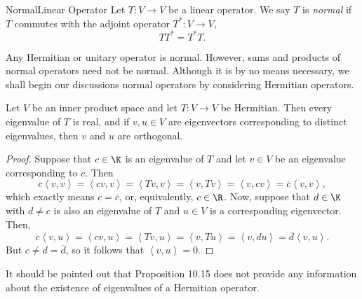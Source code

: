 \documentclass[linearalgebra]{subfiles}
\begin{document}
    \begin{definition}{Normal}{Linear Operator}
        Let $T:V\to V$ be a linear operator. We say $T$ is \emph{normal} if $T$ commutes with the adjoint operator $T^*:V\to V$,
        \begin{equation*}
            TT^* = T^*T.
        \end{equation*}
    \end{definition}

    \noindent Any Hermitian or unitary operator is normal. However, sums and products of normal operators need not be normal. Although it is by no means necessary, we shall begin our discussions normal operators by considering Hermitian operators.

    \begin{prop}{}
        Let $V$ be an inner product space and let $T:V\to V$ be Hermitian. Then every eigenvalue of $T$ is real, and if $v,u\in V$ are eigenvectors corresponding to distinct eigenvalues, then $v$ and $u$ are orthogonal.
    \end{prop}

    \begin{proof}
        Suppose that $c\in\K$ is an eigenvalue of $T$ and let $v\in V$ be an eigenvalue corresponding to $c$. Then
        \begin{equation*}
            c\left\langle v, v\right\rangle = \left\langle cv, v\right\rangle = \left\langle Tv, v\right\rangle = \left\langle v, Tv\right\rangle = \left\langle v, cv\right\rangle = \overline{c} \left\langle v, v\right\rangle ,
        \end{equation*}
        which exactly means $c=\overline{c}$, or, equivalently, $c\in\R$. Now, suppose that $d\in\K$ with $d\neq c$ is also an eigenvalue of $T$ and $u\in V$ is a corresponding eigenvector. Then,
        \begin{equation*}
            c\left\langle v, u\right\rangle = \left\langle cv, u\right\rangle = \left\langle Tv, u\right\rangle = \left\langle v, Tu\right\rangle = \left\langle v, du\right\rangle = \overline{d} \left\langle v, u\right\rangle .
        \end{equation*}
        But $c\neq d=\overline{d}$, so it follows that $\left\langle v, u\right\rangle = 0$.
    \end{proof}

    \begin{remark}
        It should be pointed out that Proposition 10.15 does not provide any information about the existence of eigenvalues of a Hermitian operator.
    \end{remark}
\end{document}
